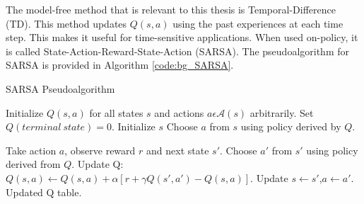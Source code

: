 \documentclass[11pt]{report}
\begin{document}
	\par The model-free method that is relevant to this thesis is Temporal-Difference (TD). This method updates $Q(s,a)$ using the past experiences at each time step. This makes it useful for time-sensitive applications. When used on-policy, it is called State-Action-Reward-State-Action (SARSA). The pseudoalgorithm for SARSA is provided in Algorithm \ref{code:bg_SARSA}.
	
	\begin{algorithm}[ht]
	\caption{SARSA Pseudoalgorithm}
	\label{code:bg_SARSA}
	\begin{algorithmic}[1]
		\State Initialize $Q(s,a)$ for all states $s$ and actions $a \epsilon \mathcal{A}(s)$ arbitrarily. Set $Q(terminal\ state)=0$.
		\State Initialize $s$
		\State Choose $a$ from $s$ using policy derived by $Q$.
		
		\State Take action $a$, observe reward $r$ and next state $s'$.
		\State Choose $a'$ from $s'$ using policy derived from $Q$.
		\State Update Q: $Q(s,a) \gets Q(s,a) + \alpha[r + \gamma Q(s',a')-Q(s,a)]$.
		\State Update $s \gets s'$,$a \gets a'$.
		\EndWhile
		\EndWhile
		\State \Return Updated Q table.
		\EndProcedure
	\end{algorithmic}
\end{algorithm}
\end{document}
